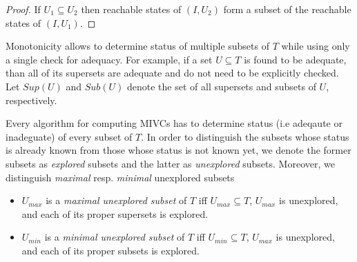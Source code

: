 \begin{proof}
If $U_1 \subseteq U_2$ then reachable states of $(I, U_2)$ form  a subset of the reachable states
of $(I, U_1)$.
\end{proof}
%


Monotonicity allows  to determine status  of multiple subsets of $T$ while using only a single check for adequacy. For example, if a set $U \subseteq T$ is found to be adequate, than all of its supersets are   adequate and do not need to be explicitly checked. Let     $\mathit{Sup}(U)$ and $\mathit{Sub}(U)$ denote the set of all supersets and subsets of $U$, respectively.

Every algorithm for computing MIVCs has to determine status (i.e adeqaute or inadeguate) of every subset of $T$.  In order to distinguish the subsets whose status is already known from those whose status is not known yet, we denote the former subsets as \emph{explored} subsets and the latter as \emph{unexplored} subsets. Moreover, we distinguish \emph{maximal} resp. \emph{minimal} unexplored subsets 
\begin{itemize}
	\item $U_{max}$ is a \emph{maximal unexplored subset} of $T$ iff $U_{max} \subseteq T$, $U_{max}$ is unexplored, and each of its proper supersets is explored.
	\item $U_{min}$ is a \emph{minimal unexplored subset} of $T$ iff $U_{min} \subseteq T$, $U_{max}$ is unexplored, and each of its proper subsets is explored.
\end{itemize}


